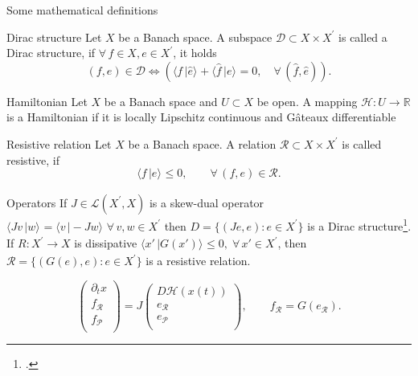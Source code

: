 \documentclass[aspectratio=169]{beamer}
\newcommand{\bbR}{\mathbb{R}}
\newcommand{\dualpr}[3][]{\ensuremath{\langle #2 \, \vert #3 \rangle_{#1}}}
\begin{document}
\begin{frame}{Some mathematical definitions}
	\begin{block}{Dirac structure}
			Let $X$ be a Banach space. A subspace $\mathcal{D}\subset X \times X^{'}$ is called a Dirac structure, if $\forall \, f \in X, e \in X^{'}$, it holds
			\begin{equation*}
				(f, e) \in \mathcal{D} \iff \left( \dualpr{f}{\hat{e}} + \dualpr{\hat{f}}{e}=0, \quad \forall\, (\hat{f}, \hat{e})\right).
			\end{equation*}
		\end{block}

		\begin{block}{Hamiltonian}
			Let $X$ be a Banach space and $U \subset X$ be open. A mapping $\mathcal{H} : U \rightarrow \bbR$ is a Hamiltonian if it is locally Lipschitz continuous and G\^{a}teaux differentiable
		\end{block}
		
		\begin{block}{Resistive relation}
			Let $X$ be a Banach space.
			A relation $\mathcal{R} \subset X \times X^{'}$ is called resistive, if
			\begin{equation*}
				\dualpr{f}{e} \le 0, \qquad \forall\, (f,e) \in \mathcal{R}.
			\end{equation*}
		
		\end{block}

\end{frame}

\begin{frame}{Operators}
	If $J \in \mathcal{L}(X^{'}, X)$ is a skew-dual operator $\dualpr{J v}{w}= \dualpr{v}{-Jw}\; \forall\, v, w \in X^{'}$ then $D = \{(J e, e) : e \in X^{'}\}$ is a Dirac structure\footcite{reis2022passivity}.\\
	\vspace{.2cm}
	If $R :X^{'} \rightarrow X$ is dissipative $\dualpr{x{'}}{G(x{'})} \le 0,\; \forall \, x{'} \in X^{'}$, then $\mathcal{R} = \{(G(e), e) : e \in X^{'}\}$ is a resistive relation.
	
	\begin{equation*}
		\begin{pmatrix}
			\partial_t x \\
			f_\mathcal{R} \\
			f_\mathcal{P} \\
		\end{pmatrix} =
		J
		\begin{pmatrix}
			D\mathcal{H}(x(t)) \\
			e_\mathcal{R} \\
			e_\mathcal{P} \\
		\end{pmatrix}, \qquad f_{\mathcal{R}} = G(e_{\mathcal{R}}).
	\end{equation*}
\end{frame}
\end{document}
